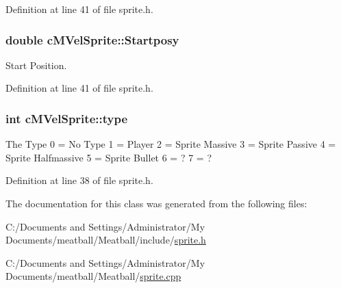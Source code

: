 Definition at line 41 of file sprite.\-h.

\hypertarget{classc_m_vel_sprite_a06ae842d0bb5bbc2fd07da3d6804033d}{
\subsubsection[{Startposy}]{\setlength{\rightskip}{0pt plus 5cm}double c\-M\-Vel\-Sprite\-::\-Startposy}}\label{classc_m_vel_sprite_a06ae842d0bb5bbc2fd07da3d6804033d}


Start Position. 



Definition at line 41 of file sprite.\-h.

\hypertarget{classc_m_vel_sprite_ab23eadf4d20417f5e5b418cd7cffe8e3}{
\subsubsection[{type}]{\setlength{\rightskip}{0pt plus 5cm}int c\-M\-Vel\-Sprite\-::type}}\label{classc_m_vel_sprite_ab23eadf4d20417f5e5b418cd7cffe8e3}
The Type 0 = No Type 1 = Player 2 = Sprite Massive 3 = Sprite Passive 4 = Sprite Halfmassive 5 = Sprite Bullet 6 = ? 7 = ? 

Definition at line 38 of file sprite.\-h.



The documentation for this class was generated from the following files\-:\begin{DoxyCompactItemize}
\item 
C\-:/\-Documents and Settings/\-Administrator/\-My Documents/meatball/\-Meatball/include/\hyperlink{include_2sprite_8h}{sprite.\-h}\item 
C\-:/\-Documents and Settings/\-Administrator/\-My Documents/meatball/\-Meatball/\hyperlink{sprite_8cpp}{sprite.\-cpp}\end{DoxyCompactItemize}
